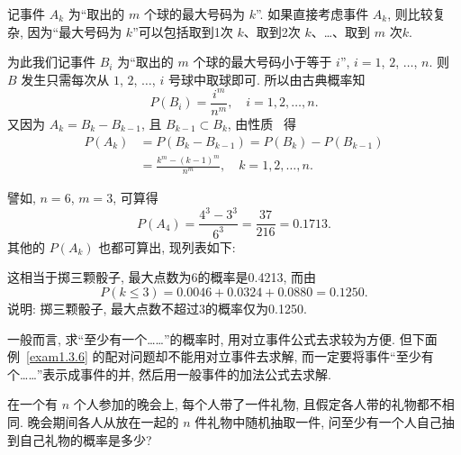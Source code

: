 \begin{solution}
    记事件 $A_k$ 为“取出的 $m$ 个球的最大号码为 $k$”.
    如果直接考虑事件 $A_k$,
    则比较复杂,
    因为“最大号码为 $k$”可以包括取到1次 $k$、取到2次 $k$、\dots、取到 $m$ 次$k$.

    为此我们记事件 $B_i$ 为“取出的 $m$ 个球的最大号码小于等于 $i$”, $i=1$, $2$, $\dotsc$, $n$.
    则 $B$ 发生只需每次从 $1$, $2$, $\dotsc$, $i$ 号球中取球即可.
    所以由古典概率知
    \[
        P(B_i) = \frac{i^m}{n^m}, \quad i = 1, 2, \dotsc, n.
    \]
    又因为 $A_k = B_k - B_{k-1}$,
    且 $B_{k-1} \subset B_k$,
    由性质~\label{property1.3.4} 得
    \begin{align*}
        P(A_k) & = P(B_k - B_{k-1}) = P(B_k) - P(B_{k-1})                 \\
               & = \frac{k^m - (k - 1)^m}{n^m}, \quad k = 1,2, \dotsc, n.
    \end{align*}

    譬如,
    $n = 6$, $m = 3$,
    可算得
    \[
        P(A_4) = \frac{4^3 - 3^3}{6^3} = \frac{37}{216} = 0.1713.
    \]
    其他的 $P(A_k)$ 也都可算出,
    现列表如下:



    这相当于掷三颗骰子,
    最大点数为6的概率是0.4213,
    而由
    \[
        P(k \le 3) = 0.0046 + 0.0324 + 0.0880 = 0.1250.
    \]
    说明:
    掷三颗骰子,
    最大点数不超过3的概率仅为0.1250.
\end{solution}

一般而言,
求“至少有一个……”的概率时,
用对立事件公式去求较为方便.
但下面例~\ref{exam1.3.6} 的配对问题却不能用对立事件去求解,
而一定要将事件“至少有个……”表示成事件的并,
然后用一般事件的加法公式去求解.

\begin{example}[配对问题]\label{exam1.3.6}
    在一个有 $n$ 个人参加的晚会上,
    每个人带了一件礼物,
    且假定各人带的礼物都不相同.
    晚会期间各人从放在一起的 $n$ 件礼物中随机抽取一件,
    问至少有一个人自己抽到自己礼物的概率是多少?
\end{example}

